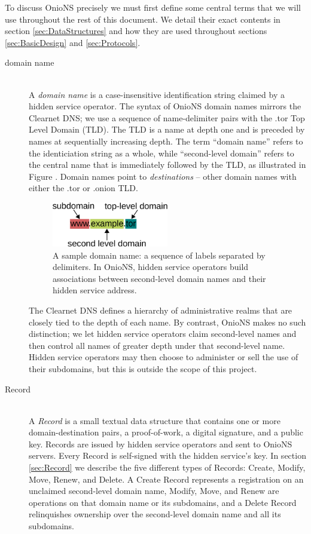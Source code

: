 To discuss OnioNS precisely we must first define some central terms that we will use throughout the rest of this document. We detail their exact contents in section \ref{sec:DataStructures} and how they are used throughout sections \ref{sec:BasicDesign} and \ref{sec:Protocols}.

\begin{description}
	\item[domain name] \hfill \\
		A \emph{domain name} is a case-insensitive identification string claimed by a hidden service operator. The syntax of OnioNS domain names mirrors the Clearnet DNS; we use a sequence of name-delimiter pairs with the .tor Top Level Domain (TLD). The TLD is a name at depth one and is preceded by names at sequentially increasing depth. The term ``domain name'' refers to the identiciation string as a whole, while ``second-level domain'' refers to the central name that is immediately followed by the TLD, as illustrated in Figure \label{fig:sampleDomain}. Domain names point to \emph{destinations} -- other domain names with either the .tor or .onion TLD.
		
		\begin{figure}[htbp]
			\centering
			\includegraphics[width=0.5\textwidth]{images/domain-name.eps}
			\caption{A sample domain name: a sequence of labels separated by delimiters. In OnioNS, hidden service operators build associations between second-level domain names and their hidden service address.}
			\label{fig:sampleDomain}
		\end{figure}
		
	The Clearnet DNS defines a hierarchy of administrative realms that are closely tied to the depth of each name. By contrast, OnioNS makes no such distinction; we let hidden service operators claim second-level names and then control all names of greater depth under that second-level name. Hidden service operators may then choose to administer or sell the use of their subdomains, but this is outside the scope of this project.

	\item[Record] \hfill \\
		A \emph{Record} is a small textual data structure that contains one or more domain-destination pairs, a proof-of-work, a digital signature, and a public key. Records are issued by hidden service operators and sent to OnioNS servers. Every Record is self-signed with the hidden service's key. In section \ref{sec:Record} we describe the five different types of Records: Create, Modify, Move, Renew, and Delete. A Create Record represents a registration on an unclaimed second-level domain name, Modify, Move, and Renew are operations on that domain name or its subdomains, and a Delete Record relinquishes ownership over the second-level domain name and all its subdomains.
		

\end{description}
